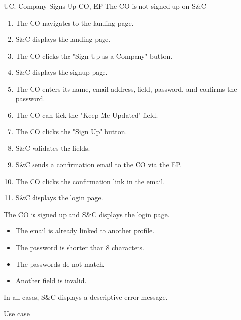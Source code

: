 \clearpage
\begin{usecase}
    {UC\theuc. Company Signs Up}
    {CO, EP}
    {The CO is not signed up on S\&C.}
    {\begin{enumerate}[leftmargin=*]
        \item The CO navigates to the landing page.
        \item S\&C displays the landing page.
        \item The CO clicks the "Sign Up as a Company" button.
        \item S\&C displays the signup page.
        \item The CO enters its name, email address, field, password, and confirms the password.
        \item The CO can tick the "Keep Me Updated" field.
        \item The CO clicks the "Sign Up" button.
        \item S\&C validates the fields.
        \item S\&C sends a confirmation email to the CO via the EP.
        \item The CO clicks the confirmation link in the email.
        \item S\&C displays the login page.
    \end{enumerate}}
    {The CO is signed up and S\&C displays the login page.}
    {\begin{itemize}[leftmargin=*, label=\tiny\textbullet]
        \item The email is already linked to another profile.
        \item The password is shorter than 8 characters.
        \item The passwords do not match.
        \item Another field is invalid.
    \end{itemize}
    In all cases, S\&C displays a descriptive error message.}
    {Use case \theuc}
\end{usecase}

